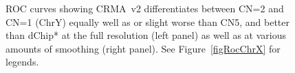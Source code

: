\documentclass{bioinfo}
\begin{document}
\begin{figure}[!tpbh]
\begin{center}
\end{center}
 \caption{
   ROC curves showing CRMA~v2 differentiates between CN=2 and CN=1 (ChrY) equally well as or slight worse than CN5, and better than dChip* at the full resolution (left panel) as well as at various amounts of smoothing (right panel).  
   See Figure~\ref{figRocChrX} for legends.
 }
 \label{figRocChrY}
\end{figure}
\end{document}
